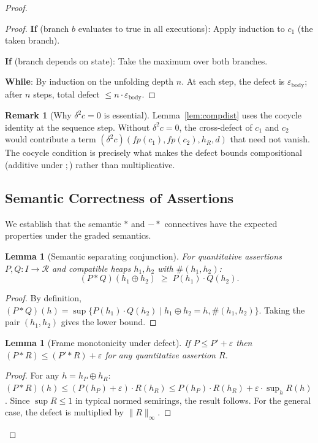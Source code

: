 \documentclass[acmsmall,sigplan,anonymous,review,screen]{acmart}
\theoremstyle{plain}
\newtheorem{lemma}[theorem]{Lemma}
\theoremstyle{definition}
\newtheorem{remark}[theorem]{Remark}
\newcommand{\fp}{\mathit{fp}}
\newcommand{\sep}{*}
\newcommand{\wand}{-\!\!*}
\newcommand{\norm}[1]{\|#1\|}
\newcommand{\defect}{\varepsilon}
\begin{document}
\begin{proof}
\begin{proof}
  \textbf{If} (branch $b$ evaluates to true in all executions):
  Apply induction to $c_1$ (the taken branch).

  \textbf{If} (branch depends on state): Take the maximum over both branches.

  \textbf{While}: By induction on the unfolding depth $n$.
  At each step, the defect is $\defect_{\mathrm{body}}$; after $n$ steps,
  total defect $\leq n \cdot \defect_{\mathrm{body}}$.
\end{proof}

\begin{remark}[Why $\delta^2 c = 0$ is essential]
  Lemma~\ref{lem:compdist} uses the cocycle identity at the sequence step.
  Without $\delta^2 c = 0$, the cross-defect of $c_1$ and $c_2$ would
  contribute a term $(\delta^2 c)(\fp(c_1), \fp(c_2), h_R, d)$ that need
  not vanish.  The cocycle condition is precisely what makes the defect
  bounds compositional (additive under $;$) rather than multiplicative.
\end{remark}

\subsection{Semantic Correctness of Assertions}
\label{sec:semantics:correct}

We establish that the semantic $\sep$ and $\wand$ connectives have the
expected properties under the graded semantics.

\begin{lemma}[Semantic separating conjunction]
\label{lem:sep}
  For quantitative assertions $P, Q : I \to \mathcal{R}$ and compatible
  heaps $h_1, h_2$ with $\#(h_1, h_2)$:
  \[
    (P \sep Q)(h_1 \oplus h_2) \;\geq\; P(h_1) \cdot Q(h_2).
  \]
\end{lemma}

\begin{proof}
  By definition, $(P \sep Q)(h) = \sup\{ P(h_1) \cdot Q(h_2) \mid
  h_1 \oplus h_2 = h, \#(h_1, h_2) \}$.  Taking the pair $(h_1, h_2)$
  gives the lower bound.
\end{proof}

\begin{lemma}[Frame monotonicity under defect]
\label{lem:frame-mono}
  If $P \leq P' + \defect$ then $(P \sep R) \leq (P' \sep R) + \defect$
  for any quantitative assertion $R$.
\end{lemma}

\begin{proof}
  For any $h = h_P \oplus h_R$:
  $(P \sep R)(h) \leq (P(h_P) + \defect) \cdot R(h_R)
  \leq P(h_P) \cdot R(h_R) + \defect \cdot \sup_h R(h)$.
  Since $\sup R \leq 1$ in typical normed semirings, the result follows.
  For the general case, the defect is multiplied by $\norm{R}_\infty$.
\end{proof}


\end{proof}
\end{document}
